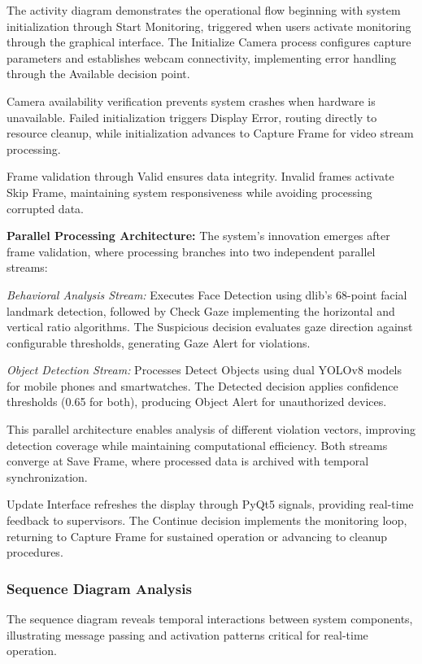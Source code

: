 \documentclass[conference]{IEEEtran}
\begin{document}
The activity diagram demonstrates the operational flow beginning with system 
initialization through Start Monitoring, triggered when users activate monitoring 
through the graphical interface. The Initialize Camera process configures capture 
parameters and establishes webcam connectivity, implementing error handling through 
the Available decision point.

Camera availability verification prevents system crashes 
when hardware is unavailable. Failed initialization triggers Display Error, 
routing directly to resource cleanup, while initialization advances to 
Capture Frame for video stream processing.

Frame validation through Valid ensures data integrity. Invalid frames 
activate Skip Frame, maintaining system responsiveness while avoiding processing 
corrupted data.

\textbf{Parallel Processing Architecture:} The system's innovation emerges after 
frame validation, where processing branches into two independent parallel streams:

\textit{Behavioral Analysis Stream:} Executes Face Detection using dlib's 68-point 
facial landmark detection, followed by Check Gaze implementing the horizontal 
and vertical ratio algorithms. The Suspicious decision evaluates gaze direction 
against configurable thresholds, generating Gaze Alert for violations.

\textit{Object Detection Stream:} Processes Detect Objects using 
dual YOLOv8 models for mobile phones and smartwatches. The Detected decision 
applies confidence thresholds (0.65 for both), producing Object Alert 
for unauthorized devices.

This parallel architecture enables analysis of different violation vectors, 
improving detection coverage while maintaining computational efficiency. 
Both streams converge at Save Frame, where processed data is archived with 
temporal synchronization.

Update Interface refreshes the display through PyQt5 signals, providing real-time 
feedback to supervisors. The Continue decision implements the monitoring loop, 
returning to Capture Frame for sustained operation or advancing to cleanup procedures.

\subsubsection{Sequence Diagram Analysis}

The sequence diagram reveals temporal interactions between system components, illustrating 
message passing and activation patterns critical for real-time operation.
\end{document}
